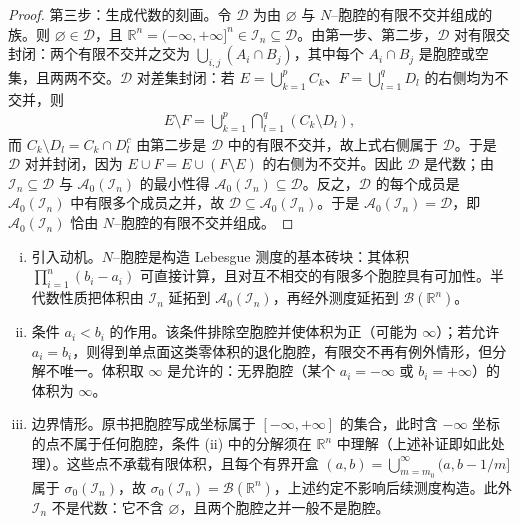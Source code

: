 \documentclass[../../main.tex]{subfiles}%
\begin{document}
\begin{proof}
第三步：生成代数的刻画。令 $\mathcal{D}$ 为由 $\varnothing$ 与 $N$--胞腔的有限不交并组成的族。则 $\varnothing\in\mathcal{D}$，且 $\mathbb{R}^n=(-\infty,+\infty]^n\in\mathcal{I}_n\subseteq\mathcal{D}$。由第一步、第二步，$\mathcal{D}$ 对有限交封闭：两个有限不交并之交为 $\bigcup_{i,j}(A_i\cap B_j)$，其中每个 $A_i\cap B_j$ 是胞腔或空集，且两两不交。$\mathcal{D}$ 对差集封闭：若 $E=\bigcup_{k=1}^pC_k$、$F=\bigcup_{l=1}^qD_l$ 的右侧均为不交并，则
\begin{align*}
E\setminus F=\bigcup_{k=1}^p\bigcap_{l=1}^q(C_k\setminus D_l),
\end{align*}
而 $C_k\setminus D_l=C_k\cap D_l^c$ 由第二步是 $\mathcal{D}$ 中的有限不交并，故上式右侧属于 $\mathcal{D}$。于是 $\mathcal{D}$ 对并封闭，因为 $E\cup F=E\cup(F\setminus E)$ 的右侧为不交并。因此 $\mathcal{D}$ 是代数；由 $\mathcal{I}_n\subseteq\mathcal{D}$ 与 $\mathcal{A}_0(\mathcal{I}_n)$ 的最小性得 $\mathcal{A}_0(\mathcal{I}_n)\subseteq\mathcal{D}$。反之，$\mathcal{D}$ 的每个成员是 $\mathcal{A}_0(\mathcal{I}_n)$ 中有限多个成员之并，故 $\mathcal{D}\subseteq\mathcal{A}_0(\mathcal{I}_n)$。于是 $\mathcal{A}_0(\mathcal{I}_n)=\mathcal{D}$，即 $\mathcal{A}_0(\mathcal{I}_n)$ 恰由 $N$--胞腔的有限不交并组成。
\end{proof}

\begin{remark}\label{remark:ch01-N胞腔}
\begin{enumerate}[(i)]
\item 引入动机。$N$--胞腔是构造 Lebesgue 测度的基本砖块：其体积 $\prod_{i=1}^n(b_i-a_i)$ 可直接计算，且对互不相交的有限多个胞腔具有可加性。半代数性质把体积由 $\mathcal{I}_n$ 延拓到 $\mathcal{A}_0(\mathcal{I}_n)$，再经外测度延拓到 $\mathcal{B}(\mathbb{R}^n)$。
\item 条件 $a_i<b_i$ 的作用。该条件排除空胞腔并使体积为正（可能为 $\infty$）；若允许 $a_i=b_i$，则得到单点面这类零体积的退化胞腔，有限交不再有例外情形，但分解不唯一。体积取 $\infty$ 是允许的：无界胞腔（某个 $a_i=-\infty$ 或 $b_i=+\infty$）的体积为 $\infty$。
\item 边界情形。原书把胞腔写成坐标属于 $[-\infty,+\infty]$ 的集合，此时含 $-\infty$ 坐标的点不属于任何胞腔，条件 (ii) 中的分解须在 $\mathbb{R}^n$ 中理解（上述补证即如此处理）。这些点不承载有限体积，且每个有界开盒 $(a,b)=\bigcup_{m=m_0}^{\infty}(a,b-1/m]$ 属于 $\sigma_0(\mathcal{I}_n)$，故 $\sigma_0(\mathcal{I}_n)=\mathcal{B}(\mathbb{R}^n)$，上述约定不影响后续测度构造。此外 $\mathcal{I}_n$ 不是代数：它不含 $\varnothing$，且两个胞腔之并一般不是胞腔。
\end{enumerate}
\end{remark}
\end{document}
